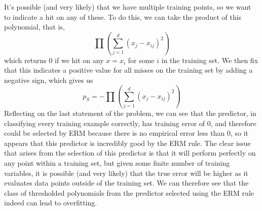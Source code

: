 \documentclass{article}
\begin{document}
{It's possible (and very likely) that we have multiple training points, so we want to indicate a hit on any of these. To do this, we can take the product of this polynomial, that is, 
\[
  \prod (\sum_{j = 1}^{d} (x_j - x_{ij})^2)
\]
which returns 0 if we hit on any \(x = x_i\) for some \(i\) in the training set. We then fix that this indicates a positive value for all misses on the training set by adding a negative sign, which gives us 
\[
  \boxed{p_S = -\prod (\sum_{j = 1}^{d} (x_j - x_{ij})^2)}
\]
Reflecting on the last statement of the problem, we can see that the predictor, in classifying every training example correctly, has training error of 0, and therefore could be selected by ERM because there is no empirical error less than 0, so it appears that this predictor is incredibly good by the ERM rule. The clear issue that arises from the selection of this predictor is that it will perform perfectly on any point within a training set, but given some finite number of training variables, it is possible (and very likely) that the true error will be higher as it evaluates data points outside of the training set. We can therefore see that the class of thresholded polynomials from the predictor selected using the ERM rule indeed can lead to overfitting.

}
\end{document}

